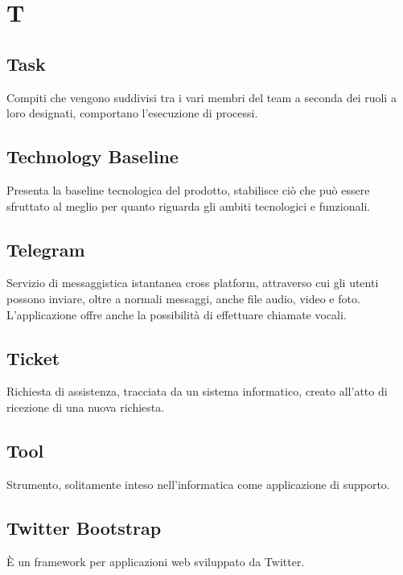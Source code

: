 \section*{T}

\subsection{Task}
Compiti che vengono suddivisi tra i vari membri del team a seconda dei ruoli a loro designati, comportano l'esecuzione di processi.

\subsection{Technology Baseline}
Presenta la baseline tecnologica del prodotto, stabilisce ciò che può essere sfruttato al meglio per quanto riguarda gli ambiti tecnologici  e funzionali.

\subsection{Telegram}
Servizio di messaggistica istantanea cross platform, attraverso cui gli utenti possono inviare, oltre a normali messaggi, anche file audio, video e foto. L'applicazione offre anche la possibilità di effettuare chiamate vocali.

\subsection{Ticket}
Richiesta di assistenza, tracciata da un sistema informatico, creato all'atto di ricezione di una nuova richiesta.

\subsection{Tool}
Strumento, solitamente inteso nell'informatica come applicazione di supporto.

\subsection{Twitter Bootstrap}
È un framework per applicazioni web sviluppato da Twitter.


